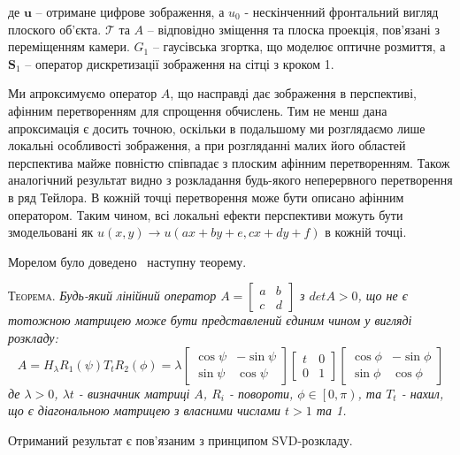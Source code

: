 де $\textbf{u}$ -- отримане цифрове зображення, а $u_0$ - нескінченний фронтальний вигляд плоского об'єкта. $\mathcal{T}$ та $A$ -- відповідно зміщення та плоска проекція, пов'язані з переміщенням камери. $G_1$ -- гаусівська згортка, що моделює оптичне розмиття, а $\textbf{S}_1$ -- оператор дискретизації зображення на сітці з кроком 1. 

Ми апроксимуємо оператор $A$, що насправді дає зображення в перспективі, афінним перетворенням для спрощення обчислень. Тим не менш дана апроксимація є досить точною, оскільки в подальшому ми розглядаємо лише локальні особливості зображення, а при розгляданні малих його областей перспектива майже повністю співпадає з плоским афінним перетворенням. Також аналогічний результат видно з розкладання будь-якого неперервного перетворення в ряд Тейлора. В кожній точці перетворення може бути описано афінним оператором. Таким чином, всі локальні ефекти перспективи можуть бути змодельовані як $u(x,y) \rightarrow u(ax+by+e, cx+dy+f)$ в кожній точці.

Морелом було доведено~\cite{Morel2009} наступну теорему. 

\textsc{Теорема.}
\textit{
Будь-який лінійний оператор 
$A=\begin{bmatrix}a&b \\ c&d\end{bmatrix}$ з $detA > 0$, що не є тотожною матрицею може бути представлений єдиним чином у вигляді розкладу:
  \begin{equation}
    \label{eq:asift-decomposition}
    A = H_\lambda R_1(\psi)T_tR_2(\phi) =     
    \lambda \begin{bmatrix} 
      \cos \psi & -\sin\psi \\
      \sin\psi  & \cos\psi
    \end{bmatrix}
    \begin{bmatrix}
      t & 0 \\
      0 & 1 
    \end{bmatrix}
    \begin{bmatrix} 
      \cos \phi & -\sin\phi \\
      \sin\phi  & \cos\phi
    \end{bmatrix}
  \end{equation}
  де $\lambda>0$, $\lambda t$ - визначник матриці $A$, $R_i$ - повороти, $\phi \in \left[0,\pi\right)$, та $T_t$ - нахил, що є діагональною матрицею з власними числами $t>1$ та 1.
}

Отриманий результат є пов'язаним з принципом SVD-розкладу. 

